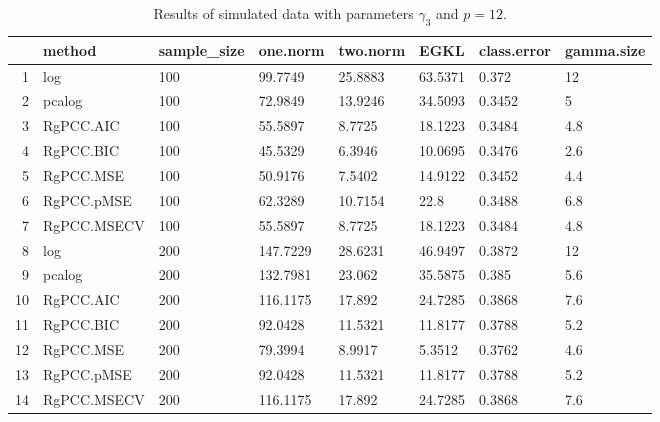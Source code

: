 \begin{table}[ht]
\centering
\begin{tabular}{rlllllll}
  \hline
 & method & sample\_size & one.norm & two.norm & EGKL & class.error & gamma.size \\ 
  \hline
1 & log & 100 & 99.7749 & 25.8883 & 63.5371 & 0.372 & 12 \\ 
  2 & pcalog & 100 & 72.9849 & 13.9246 & 34.5093 & 0.3452 & 5 \\ 
  3 & RgPCC.AIC & 100 & 55.5897 & 8.7725 & 18.1223 & 0.3484 & 4.8 \\ 
  4 & RgPCC.BIC & 100 & 45.5329 & 6.3946 & 10.0695 & 0.3476 & 2.6 \\ 
  5 & RgPCC.MSE & 100 & 50.9176 & 7.5402 & 14.9122 & 0.3452 & 4.4 \\ 
  6 & RgPCC.pMSE & 100 & 62.3289 & 10.7154 & 22.8 & 0.3488 & 6.8 \\ 
  7 & RgPCC.MSECV & 100 & 55.5897 & 8.7725 & 18.1223 & 0.3484 & 4.8 \\ 
  8 & log & 200 & 147.7229 & 28.6231 & 46.9497 & 0.3872 & 12 \\ 
  9 & pcalog & 200 & 132.7981 & 23.062 & 35.5875 & 0.385 & 5.6 \\ 
  10 & RgPCC.AIC & 200 & 116.1175 & 17.892 & 24.7285 & 0.3868 & 7.6 \\ 
  11 & RgPCC.BIC & 200 & 92.0428 & 11.5321 & 11.8177 & 0.3788 & 5.2 \\ 
  12 & RgPCC.MSE & 200 & 79.3994 & 8.9917 & 5.3512 & 0.3762 & 4.6 \\ 
  13 & RgPCC.pMSE & 200 & 92.0428 & 11.5321 & 11.8177 & 0.3788 & 5.2 \\ 
  14 & RgPCC.MSECV & 200 & 116.1175 & 17.892 & 24.7285 & 0.3868 & 7.6 \\ 
   \hline
\end{tabular}
\caption{Results of simulated data with parameters $\gamma_3$ and $p =12$. } 
\label{fig-3-lead-12-metrics-p}
\end{table}
